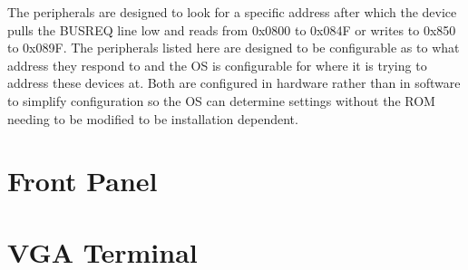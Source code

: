 \documentclass{book}
\begin{document}
The peripherals  are designed to look for a specific address after which the device pulls the BUSREQ line low and reads from 0x0800 to 0x084F or writes to 0x850 to 0x089F. The peripherals listed here are designed to be configurable as to what address they respond to and the OS is configurable for where it is trying to address these devices at. Both are configured in hardware rather than in software to simplify configuration so the OS can determine settings without the ROM needing to be modified to be installation dependent.

\chapter{Front Panel}

\chapter{VGA Terminal}
\end{document}
